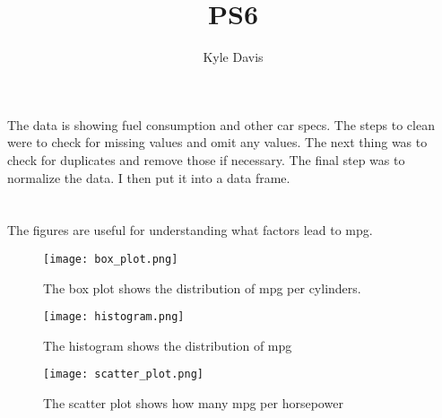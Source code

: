 \documentclass{article}
\title{PS6}
\author{Kyle Davis}
\begin{document}
\maketitle



\section{}

The data is showing fuel consumption and other car specs. The steps to clean were to check for missing values and omit any values. The next thing was to check for duplicates and remove those if necessary. The final step was to normalize the data. I then put it into a data frame.

\section{}
The figures are useful for understanding what factors lead to mpg.

\begin{figure}
\centering
\texttt{[image: box\_plot.png]}
\caption{The box plot shows the distribution of mpg per cylinders.}
\end{figure}

\begin{figure}
    \centering
    \texttt{[image: histogram.png]}
    \caption{The histogram shows the distribution of mpg}
\end{figure}

\begin{figure}
    \centering
    \texttt{[image: scatter\_plot.png]}
    \caption{The scatter plot shows how many mpg per horsepower}
\end{figure}
\end{document}
